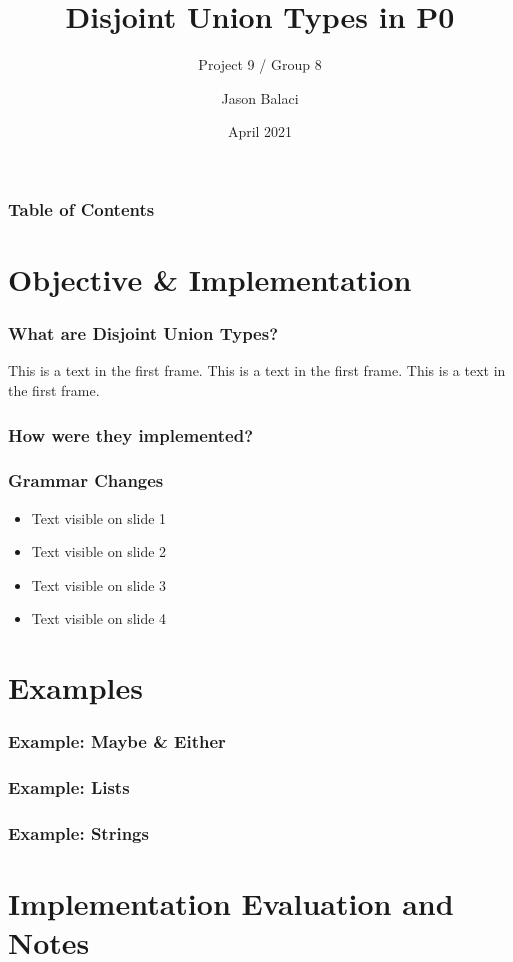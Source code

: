 \documentclass{beamer}
\title[Disjoint Union Types]{Disjoint Union Types in P0}
\subtitle{Project 9 / Group 8}
\author{Jason Balaci}
\institute{McMaster University}
\date{April 2021}
\begin{document}
\frame{\titlepage}

\begin{frame}
\frametitle{Table of Contents}
\tableofcontents
\end{frame}

\section{Objective \& Implementation}

\begin{frame}
\frametitle{What are Disjoint Union Types?}
This is a text in the first frame. This is a text in the first frame. This is a text in the first frame.\\
\end{frame}

\begin{frame}
\frametitle{How were they implemented?}
\end{frame}

\begin{frame}
\frametitle{Grammar Changes}

\begin{itemize}
 \item<1-> Text visible on slide 1
 \item<2-> Text visible on slide 2
 \item<3-> Text visible on slide 3
 \item<4-> Text visible on slide 4
\end{itemize}

\end{frame}

\section{Examples}

\begin{frame}
\frametitle{Example: Maybe \& Either}
\end{frame}

\begin{frame}
\frametitle{Example: Lists}
\end{frame}

\begin{frame}
\frametitle{Example: Strings}
\end{frame}

\section{Implementation Evaluation and Notes}
\end{document}
